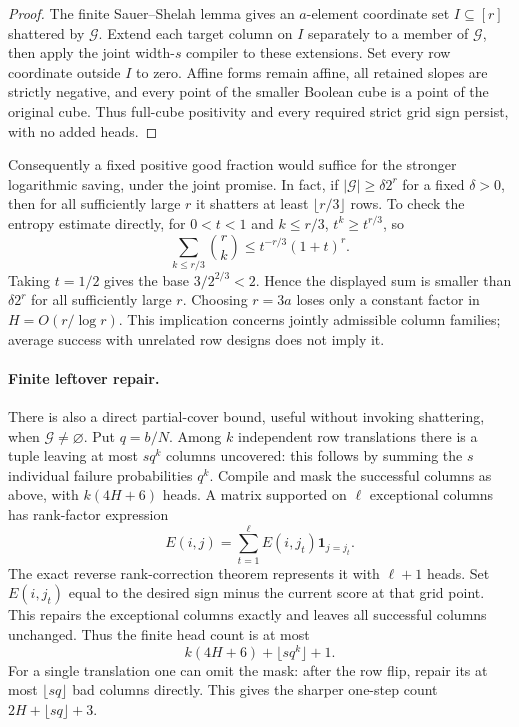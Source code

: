 \documentclass[11pt]{article}
\begin{document}
\begin{proof}
The finite Sauer--Shelah lemma gives an $a$-element coordinate set
$I\subseteq[r]$ shattered by $\mathcal G$. Extend each target column
on $I$ separately to a member of $\mathcal G$, then apply the joint
width-$s$ compiler to these extensions. Set every row coordinate
outside $I$ to zero. Affine forms remain affine, all retained slopes
are strictly negative, and every point of the smaller Boolean cube
is a point of the original cube. Thus full-cube positivity and every
required strict grid sign persist, with no added heads.
\end{proof}

Consequently a fixed positive good fraction would suffice for the
stronger logarithmic saving, under the joint promise. In fact, if
$|\mathcal G|\geq\delta2^r$ for a fixed $\delta>0$, then for all
sufficiently large $r$ it shatters at least $\lfloor r/3\rfloor$ rows.
To check the entropy estimate directly, for $0<t<1$ and $k\leq r/3$,
$t^k\geq t^{r/3}$, so
\[
 \sum_{k\leq r/3}\binom rk
 \leq t^{-r/3}(1+t)^r.
\]
Taking $t=1/2$ gives the base $3/2^{2/3}<2$. Hence the displayed
sum is smaller than $\delta2^r$ for all sufficiently large $r$.
Choosing $r=3a$ loses only a constant factor in $H=O(r/\log r)$.
This implication concerns jointly admissible column families;
average success with unrelated row designs does not imply it.

\paragraph{Finite leftover repair.}
There is also a direct partial-cover bound, useful without invoking
shattering, when $\mathcal G\neq\varnothing$. Put $q=b/N$. Among $k$
independent row translations there
is a tuple leaving at most $sq^k$ columns uncovered: this follows by
summing the $s$ individual failure probabilities $q^k$. Compile and
mask the successful columns as above, with $k(4H+6)$ heads. A matrix
supported on $\ell$ exceptional columns has rank-factor expression
\[
 E(i,j)=\sum_{t=1}^{\ell} E(i,j_t)\mathbf1_{j=j_t}.
\]
The exact reverse rank-correction theorem represents it with
$\ell+1$ heads. Set $E(i,j_t)$ equal to the desired sign minus the
current score at that grid point. This repairs the exceptional
columns exactly and leaves all successful columns unchanged. Thus
the finite head count is at most
\[
 k(4H+6)+\lfloor sq^k\rfloor+1.
\]
For a single translation one can omit the mask: after the row flip,
repair its at most $\lfloor sq\rfloor$ bad columns directly. This
gives the sharper one-step count $2H+\lfloor sq\rfloor+3$.
\end{document}
